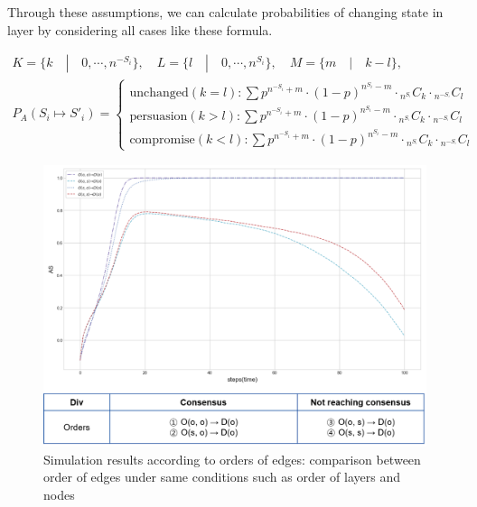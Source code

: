 Through these assumptions, we can calculate probabilities of changing state in layer by considering all cases like these formula.  

\begin{equation}
\begin{array}{l}
K = \{ k \quad|\quad 0, \cdots ,{n^{ - {S_i}}}\}, \quad L = \{l \quad|\quad 0, \cdots ,{n^{{S_i}}}\},
\quad M = \{m \quad|\quad k-l\}, \\
{P_A}({S_i} \mapsto {{S'}_i}) = \begin{cases}
\mbox{unchanged}(k = l):\sum {{p^{{n^{ - {S_i}}}+m}} \cdot {{(1 - p)}^{{n^{{S_i}}}-m}} \cdot {}_{{n^{{S_{^i}}}}}{C_k} \cdot {}_{{n^{ - {S_{^i}}}}}{C_l}} \\
\mbox{persuasion}(k > l):\sum {{p^{{n^{ - {S_i}}}+m}} \cdot {{(1 - p)}^{{n^{{S_i}}}-m}} \cdot {}_{{n^{{S_{^i}}}}}{C_k} \cdot {}_{{n^{ - {S_{^i}}}}}{C_l}} \\
\mbox{compromise}(k < l):\sum {{p^{{n^{ - {S_i}}}+m}} \cdot {{(1 - p)}^{{n^{{S_i}}}-m}} \cdot {}_{{n^{{S_{^i}}}}}{C_k} \cdot {}_{{n^{ - {S_{^i}}}}}{C_l}} 
\end{cases}
\end{array}
\end{equation}

\begin{figure}[!htb]
	\centering
	\includegraphics[width=\hsize]{figure/chap4_edgeorder.png}
	\caption{Simulation results according to orders of edges: comparison between order of edges under same conditions such as order of layers and nodes}
	\label{edgeorder}
\end{figure}

